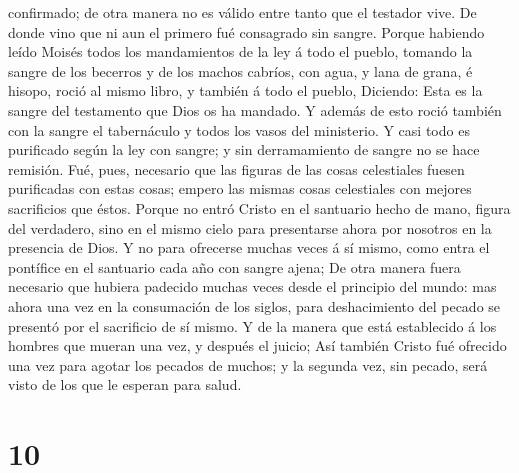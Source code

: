 confirmado; de otra manera no es válido entre tanto que el testador
vive.  De donde vino que ni aun el primero fué consagrado
sin sangre.  Porque habiendo leído Moisés todos los
mandamientos de la ley á todo el pueblo, tomando la sangre de los
becerros y de los machos cabríos, con agua, y lana de grana, é hisopo,
roció al mismo libro, y también á todo el pueblo, 
Diciendo: Esta es la sangre del testamento que Dios os ha mandado.
 Y además de esto roció también con la sangre el
tabernáculo y todos los vasos del ministerio.  Y casi
todo es purificado según la ley con sangre; y sin derramamiento de
sangre no se hace remisión.  Fué, pues, necesario que las
figuras de las cosas celestiales fuesen purificadas con estas cosas;
empero las mismas cosas celestiales con mejores sacrificios que éstos.
 Porque no entró Cristo en el santuario hecho de mano,
figura del verdadero, sino en el mismo cielo para presentarse ahora por
nosotros en la presencia de Dios.  Y no para ofrecerse
muchas veces á sí mismo, como entra el pontífice en el santuario cada
año con sangre ajena;  De otra manera fuera necesario que
hubiera padecido muchas veces desde el principio del mundo: mas ahora
una vez en la consumación de los siglos, para deshacimiento del pecado
se presentó por el sacrificio de sí mismo.  Y de la
manera que está establecido á los hombres que mueran una vez, y después
el juicio;  Así también Cristo fué ofrecido una vez para
agotar los pecados de muchos; y la segunda vez, sin pecado, será visto
de los que le esperan para salud.

\hypertarget{section-9}{%
\section{10}\label{section-9}}

